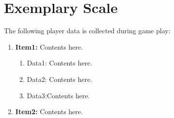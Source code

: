 \chapter {Exemplary Scale}
\label {chp:appendixE}

The following player data is collected during game play:
\begin{enumerate}[label=\textbf{\arabic*}]
\item \textbf{Item1:} Contents here.
 \begin{enumerate}
 	\item Data1: Contents here.
 	\item Data2: Contents here.
 	\item Data3:Contents here.
 \end{enumerate}
\item \textbf{Item2:} Contents here.
\end{enumerate}

